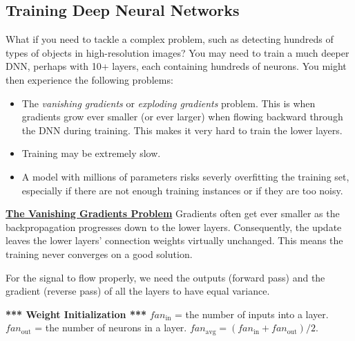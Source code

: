 \subsection{Training Deep Neural Networks}

What if you need to tackle a complex problem,
such as detecting hundreds of types of objects in high-resolution images?
% 
You may need to train a much deeper DNN,
perhaps with 10+ layers,
each containing hundreds of neurons.
% 
You might then experience the following problems:

\vspace{-5.0mm}
\begin{itemize}
\item
The \textit{vanishing gradients} or \textit{exploding gradients} problem.
This is when gradients grow ever smaller (or ever larger)
when flowing backward through the DNN during training.
This makes it very hard to train the lower layers.
\vspace{-2.0mm}
\item
Training may be extremely slow.
\vspace{-2.0mm}
\item
A model with millions of parameters risks severly overfitting the training set,
especially if there are not enough training instances or if they are too noisy.
\end{itemize}

\textbf{\underline{The Vanishing Gradients Problem}}\newline
% 
Gradients often get ever smaller as the backpropagation progresses down to the lower layers.
Consequently, the update leaves the lower layers' connection weights virtually unchanged.\newline
This means the training never converges on a good solution.

For the signal to flow properly,
we need the outputs (forward pass) and the gradient (reverse pass) of all the layers to have equal variance.\newline

\textbf{*** Weight Initialization ***}\newline
$fan_{\textrm{in}}$ = the number of inputs into a layer.\newline
$fan_{\textrm{out}}$ = the number of neurons in a layer.\newline
$fan_{\textrm{avg}} = (fan_{\textrm{in}} + fan_{\textrm{out}})/2$.

